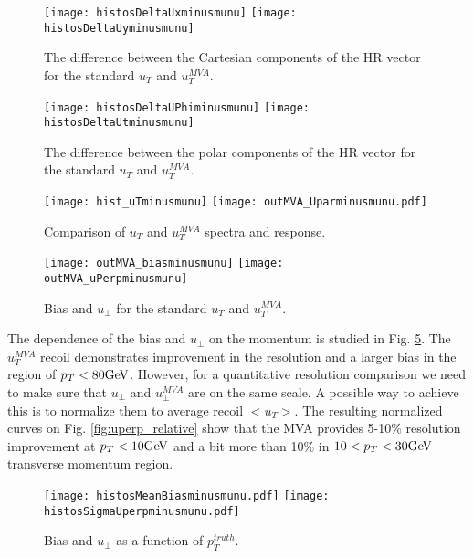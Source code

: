 	\begin{figure}[tph]
	\centering
	\texttt{[image: histosDeltaUxminusmunu]}%
	\texttt{[image: histosDeltaUyminusmunu]}
	\caption{The difference between the Cartesian components of the HR vector for the standard $u_T$ and $u_T^{MVA}$.}
	\label{fig:mva_deltas}
\end{figure}
	\begin{figure}[tph]
	\centering
	\texttt{[image: histosDeltaUPhiminusmunu]}%
	\texttt{[image: histosDeltaUtminusmunu]}
	\caption{The difference between the polar components of the HR vector for the standard $u_T$ and $u_T^{MVA}$.}
	\label{fig:mva_deltas_polar}
\end{figure}
	\begin{figure}[tph]
	\centering
	\texttt{[image: hist\_uTminusmunu]}%
	\texttt{[image: outMVA\_Uparminusmunu.pdf]}
	\caption{Comparison of $u_T$ and $u_T^{MVA}$ spectra and response.}
	\label{fig:mva_upar_pT}
\end{figure}
	\begin{figure}[tph]
	\centering
	\texttt{[image: outMVA\_biasminusmunu]}%
	\texttt{[image: outMVA\_uPerpminusmunu]}
	\caption{Bias and $u_{\perp}$ for the standard $u_T$ and $u_T^{MVA}$.}
	\label{fig:mva_bias_uperp}
\end{figure}
The dependence of the bias and $u_{\perp}$ on the momentum is studied in Fig. \ref{fig:biasuperp_vs_pt}. The $u_T^{MVA}$ recoil demonstrates improvement in the resolution and a larger bias in the region of $p_T<80\text{Ge\kern -0.1em V}$. However, for a quantitative resolution comparison we need to make sure that $u_{\perp}$ and $u_{\perp}^{MVA}$ are on the same scale. A possible way to achieve this is to normalize them to average recoil $<u_T>$. The resulting normalized curves on Fig. \ref{fig:uperp_relative} show that the MVA provides 5-10\% resolution improvement at $p_T<10\text{Ge\kern -0.1em V}$ and a bit more than 10\% in $10<p_T<30\text{Ge\kern -0.1em V}$ transverse momentum region. \\
	\begin{figure}[tph]
	\centering
	\texttt{[image: histosMeanBiasminusmunu.pdf]}%
	\texttt{[image: histosSigmaUperpminusmunu.pdf]}
	\caption{Bias and $u_{\perp}$ as a function of $p_T^{truth}$.}
	\label{fig:biasuperp_vs_pt}
\end{figure}

